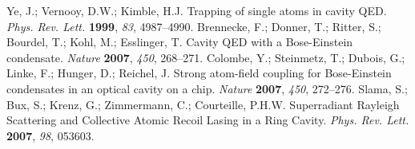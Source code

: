 \documentclass[atoms,article,accept,moreauthors,pdftex,12pt,a4paper]{mdpi}
\begin{document}
\begin{thebibliography}{----}
Ye, J.; Vernooy, D.W.; Kimble, H.J. Trapping of single atoms in cavity QED. {\em Phys. Rev. Lett.} {\bf 1999}, {\em 83}, 4987--4990.
Brennecke, F.; Donner, T.; Ritter, S.; Bourdel, T.; Kohl, M.; Esslinger, T. Cavity QED with a Bose-Einstein condensate. {\em Nature} {\bf 2007}, {\em 450},  268--271.
Colombe, Y.; Steinmetz, T.; Dubois, G.; Linke, F.; Hunger, D.; Reichel, J. Strong atom-field coupling for Bose-Einstein condensates in an optical cavity on a chip. {\em Nature} {\bf 2007}, {\em 450}, 272--276.
Slama, S.; Bux, S.; Krenz, G.; Zimmermann, C.; Courteille, P.H.W. Superradiant Rayleigh Scattering and Collective Atomic Recoil Lasing in a Ring Cavity. {\em Phys. Rev. Lett.} {\bf 2007}, {\em 98}, 053603.

\end{thebibliography}
\end{document}
